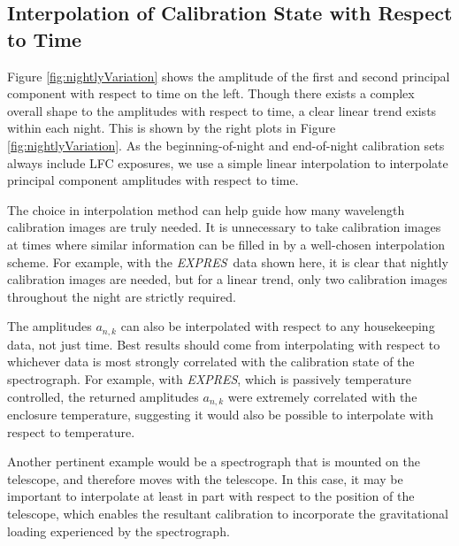 \documentclass[modern]{aastex63}
\newcommand{\project}[1]{\textsl{#1}}
\newcommand{\acronym}[1]{{\small{#1}}}
\newcommand{\expres}{\project{\acronym{EXPRES}}}
\begin{document}
\subsection{Interpolation of Calibration State with Respect to Time}
\label{sec:choice_avt}
Figure \ref{fig:nightlyVariation} shows the amplitude of the first and second principal component with respect to time on the left.  Though there exists a complex overall shape to the amplitudes with respect to time, a clear linear trend exists within each night.  This is shown by the right plots in Figure  \ref{fig:nightlyVariation}.  As the beginning-of-night and end-of-night calibration sets always include LFC exposures, we use a simple linear interpolation to interpolate principal component amplitudes with respect to time.

The choice in interpolation method can help guide how many wavelength calibration images are truly needed.  It is unnecessary to take calibration images at times where similar information can be filled in by a well-chosen interpolation scheme.  For example, with the \expres\ data shown here, it is clear that nightly calibration images are needed, but for a linear trend, only two calibration images throughout the night are strictly required.

The amplitudes $a_{n,k}$ can also be interpolated with respect to any housekeeping data, not just time.  Best results should come from interpolating with respect to whichever data is most strongly correlated with the calibration state of the spectrograph.  For example, with \expres, which is passively temperature controlled, the returned amplitudes $a_{n,k}$ were extremely correlated with the enclosure temperature, suggesting it would also be possible to interpolate with respect to temperature.

Another pertinent example would be a spectrograph that is mounted on the telescope, and therefore moves with the telescope.  In this case, it may be important to interpolate at least in part with respect to the position of the telescope, which enables the resultant calibration to incorporate the gravitational loading experienced by the spectrograph.
\end{document}
